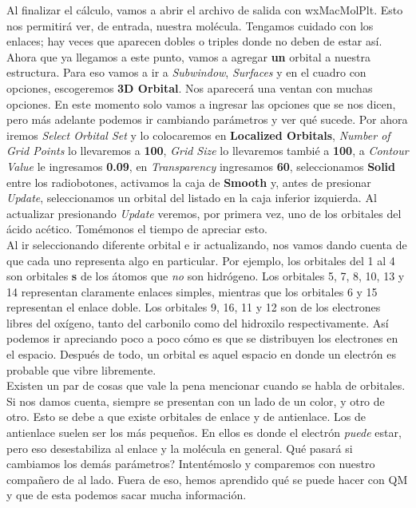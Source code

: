 \documentclass[10pt,letterpaper]{article}
\begin{document}
Al finalizar el c\'alculo, vamos a abrir el archivo de salida con wxMacMolPlt. Esto nos permitir\'a ver, de entrada, nuestra mol\'ecula. Tengamos cuidado con los enlaces; hay veces que aparecen dobles o triples donde no deben de estar as\'i. Ahora que ya llegamos a este punto, vamos a agregar \textbf{un} orbital a nuestra estructura. Para eso vamos a ir a \textit{Subwindow}, \textit{Surfaces} y en el cuadro con opciones, escogeremos \textbf{3D Orbital}. Nos aparecer\'a una ventan con muchas opciones. En este momento solo vamos a ingresar las opciones que se nos dicen, pero m\'as adelante podemos ir cambiando par\'ametros y ver qu\'e sucede. Por ahora iremos \textit{Select Orbital Set} y lo colocaremos en \textbf{Localized Orbitals}, \textit{Number of Grid Points} lo llevaremos a \textbf{100}, \textit{Grid Size} lo llevaremos tambi\'e a \textbf{100}, a \textit{Contour Value} le ingresamos \textbf{0.09}, en \textit{Transparency} ingresamos \textbf{60}, seleccionamos \textbf{Solid} entre los radiobotones, activamos la caja de \textbf{Smooth} y, antes de presionar \textit{Update}, seleccionamos un orbital del listado en la caja inferior izquierda. Al actualizar presionando \textit{Update} veremos, por primera vez, uno de los orbitales del \'acido ac\'etico. Tom\'emonos el tiempo de apreciar esto.\\

Al ir seleccionando diferente orbital e ir actualizando, nos vamos dando cuenta de que cada uno representa algo en particular. Por ejemplo, los orbitales del 1 al 4 son orbitales \textbf{s} de los \'atomos que \textit{no} son hidr\'ogeno.  Los orbitales 5, 7, 8, 10, 13 y 14 representan claramente enlaces simples, mientras que los orbitales 6 y 15 representan el enlace doble. Los orbitales 9, 16, 11 y 12 son de los electrones libres del ox\'igeno, tanto del carbonilo como del hidroxilo respectivamente. As\'i podemos ir apreciando poco a poco c\'omo es que se distribuyen los electrones en el espacio. Despu\'es de todo, un orbital es aquel espacio en donde un electr\'on es probable que vibre libremente.\\

Existen un par de cosas que vale la pena mencionar cuando se habla de orbitales. Si nos damos cuenta, siempre se presentan con un lado de un color, y otro de otro. Esto se debe a que existe orbitales de enlace y de antienlace. Los de antienlace suelen ser los m\'as peque\~nos. En ellos es donde el electr\'on \emph{puede} estar, pero eso desestabiliza al enlace y la mol\'ecula en general. Qu\'e pasar\'a si cambiamos los dem\'as par\'ametros? Intent\'emoslo y comparemos con nuestro compa\~nero de al lado. Fuera de eso, hemos aprendido qu\'e se puede hacer con QM y que de esta podemos sacar mucha informaci\'on.
\end{document}
